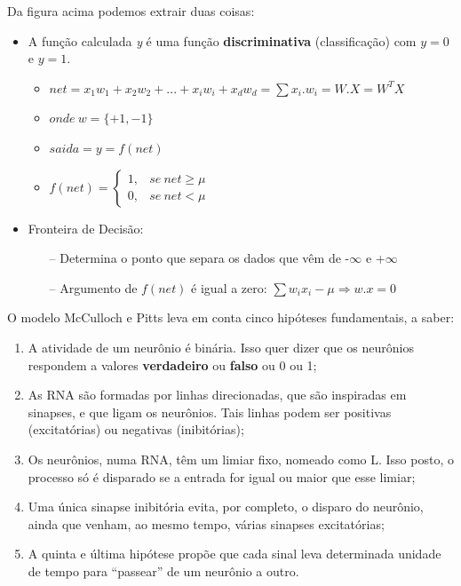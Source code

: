 Da figura acima podemos extrair duas coisas:
\begin{itemize}
 \item A função calculada \textit{y} é uma função \textbf{discriminativa} (classificação) com $y=0$ e $y=1$.
    \begin{itemize}
     \item $net = x_1w_1 + x_2w_2 + ... + x_iw_i + x_dw_d = \sum x_i.w_i = W.X = W^T X$
     \item $onde\ w = \{+1, -1\}$
     \item $saida = y = f(net)$
     \item $f(net)= \left \{ \begin{matrix} 1, & se\ net \ge \mu \\ 0, & se\ net < \mu \end{matrix} \right. $
    \end{itemize}
\vspace{1mm}
 \item Fronteira de Decisão:
    \begin{itemize}
     \item [--] Determina o ponto que separa os dados que vêm de -$\infty$ e +$\infty$
     \item [--] Argumento de $f(net)$ é igual a zero: $\sum w_ix_i - \mu \Rightarrow w.x = 0$
    \end{itemize}
\end{itemize}

\vspace{2mm}

O modelo McCulloch e Pitts \cite{mcculloch1943logical} leva em conta cinco hipóteses fundamentais, a saber:

\begin{enumerate}
 \item A atividade de um neurônio é binária. Isso quer dizer que os neurônios respondem a valores \textbf{verdadeiro} ou \textbf{falso} ou 0 ou 1;
 \item As RNA são formadas por linhas direcionadas, que são inspiradas em sinapses, e que ligam os neurônios. Tais linhas podem ser positivas (excitatórias) ou negativas (inibitórias);
 \item Os neurônios, numa RNA, têm um limiar fixo, nomeado como L. Isso posto, o processo só é disparado se a entrada for igual ou maior que esse limiar;
 \item Uma única sinapse inibitória evita, por completo, o disparo do neurônio, ainda que venham, ao mesmo tempo, várias sinapses excitatórias;
 \item A quinta e última hipótese propõe que cada sinal leva determinada unidade de tempo para ``passear'' de um neurônio a outro.
\end{enumerate}

